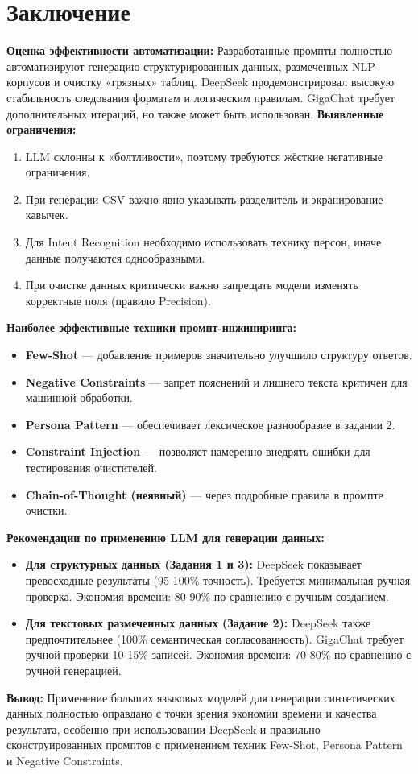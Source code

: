 \documentclass[oneside,a4paper,14pt]{extarticle} %
\begin{document}
\section*{Заключение}
\noindent
\textbf{Оценка эффективности автоматизации:} Разработанные промпты полностью автоматизируют генерацию структурированных данных, размеченных NLP-корпусов и очистку «грязных» таблиц. DeepSeek продемонстрировал высокую стабильность следования форматам и логическим правилам. GigaChat требует дополнительных итераций, но также может быть использован.
\noindent
\textbf{Выявленные ограничения:}
\begin{enumerate}
\item LLM склонны к «болтливости», поэтому требуются жёсткие негативные ограничения.
\item При генерации CSV важно явно указывать разделитель и экранирование кавычек.
\item Для Intent Recognition необходимо использовать технику персон, иначе данные получаются однообразными.
\item При очистке данных критически важно запрещать модели изменять корректные поля (правило Precision).
\end{enumerate}
\noindent
\textbf{Наиболее эффективные техники промпт-инжиниринга:}
\begin{itemize}
\item \textbf{Few-Shot} --- добавление примеров значительно улучшило структуру ответов.
\item \textbf{Negative Constraints} --- запрет пояснений и лишнего текста критичен для машинной обработки.
\item \textbf{Persona Pattern} --- обеспечивает лексическое разнообразие в задании 2.
\item \textbf{Constraint Injection} --- позволяет намеренно внедрять ошибки для тестирования очистителей.
\item \textbf{Chain-of-Thought (неявный)} --- через подробные правила в промпте очистки.
\end{itemize}
\noindent
\textbf{Рекомендации по применению LLM для генерации данных:}
\begin{itemize}
\item \textbf{Для структурных данных (Задания 1 и 3):} DeepSeek показывает превосходные результаты (95-100\% точность). Требуется минимальная ручная проверка. Экономия времени: 80-90\% по сравнению с ручным созданием.
\item \textbf{Для текстовых размеченных данных (Задание 2):} DeepSeek также предпочтительнее (100\% семантическая согласованность). GigaChat требует ручной проверки 10-15\% записей. Экономия времени: 70-80\% по сравнению с ручной генерацией.
\end{itemize}
\noindent
\textbf{Вывод:} Применение больших языковых моделей для генерации синтетических данных полностью оправдано с точки зрения экономии времени и качества результата, особенно при использовании DeepSeek и правильно сконструированных промптов с применением техник Few-Shot, Persona Pattern и Negative Constraints.
\end{document}
